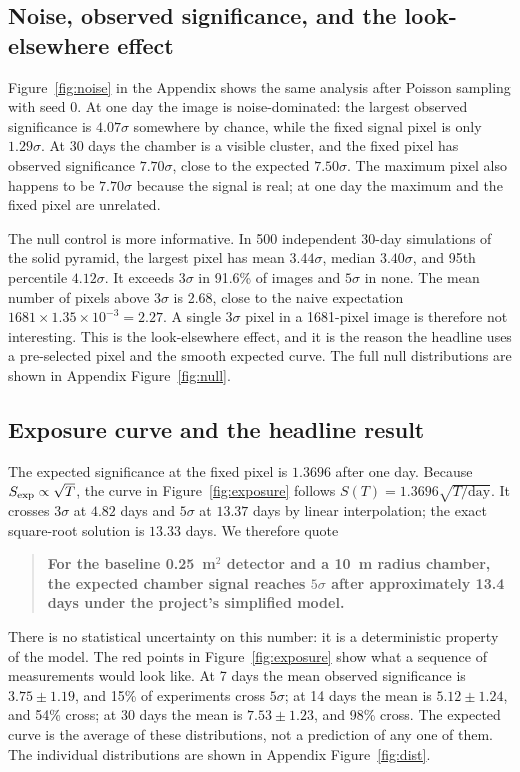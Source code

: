 \documentclass{article}
\begin{document}
\subsection{Noise, observed significance, and the look-elsewhere effect}

Figure~\ref{fig:noise} in the Appendix shows the same analysis after Poisson
sampling with seed 0. At one day the image is noise-dominated: the largest
observed significance is $4.07\sigma$ somewhere by chance, while the fixed
signal pixel is only $1.29\sigma$. At 30 days the chamber is a visible cluster, and the fixed pixel
has observed significance $7.70\sigma$, close to the expected $7.50\sigma$.
The maximum pixel also happens to be $7.70\sigma$ because the signal is real;
at one day the maximum and the fixed pixel are unrelated.

The null control is more informative. In 500 independent 30-day simulations of
the solid pyramid, the largest pixel has mean $3.44\sigma$, median
$3.40\sigma$, and 95th percentile $4.12\sigma$. It exceeds $3\sigma$ in 91.6\%
of images and $5\sigma$ in none. The mean number of pixels above $3\sigma$ is
2.68, close to the naive expectation $1681\times1.35\times10^{-3}=2.27$. A
single $3\sigma$ pixel in a 1681-pixel image is therefore not interesting. This
is the look-elsewhere effect, and it is the reason the headline uses a
pre-selected pixel and the smooth expected curve. The full null distributions
are shown in Appendix Figure~\ref{fig:null}.


\subsection{Exposure curve and the headline result}

The expected significance at the fixed pixel is $1.3696$ after one day. Because
$S_{\rm exp}\propto\sqrt{T}$, the curve in Figure~\ref{fig:exposure} follows
$S(T)=1.3696\sqrt{T/\mathrm{day}}$. It crosses $3\sigma$ at $4.82$ days and
$5\sigma$ at $13.37$ days by linear interpolation; the exact square-root
solution is $13.33$ days. We therefore quote

\begin{quote}
\textbf{For the baseline 0.25~m$^2$ detector and a 10~m radius chamber, the
expected chamber signal reaches $5\sigma$ after approximately 13.4 days under
the project's simplified model.}
\end{quote}

There is no statistical uncertainty on this number: it is a deterministic
property of the model. The red points in Figure~\ref{fig:exposure} show what a
sequence of measurements would look like. At 7 days the mean observed
significance is $3.75\pm1.19$, and 15\% of experiments cross $5\sigma$; at
14 days the mean is $5.12\pm1.24$, and 54\% cross; at 30 days the mean is
$7.53\pm1.23$, and 98\% cross. The expected curve is the average of these
distributions, not a prediction of any one of them. The individual distributions
are shown in Appendix Figure~\ref{fig:dist}.
\end{document}
